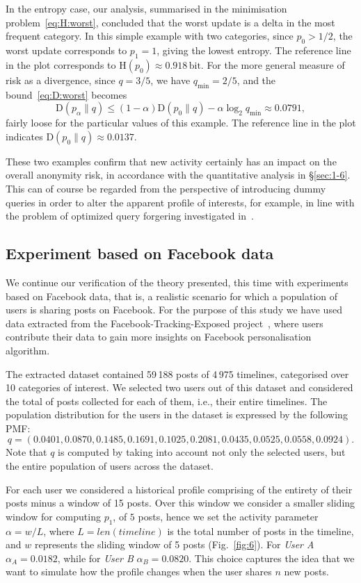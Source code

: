 In the entropy case, our analysis, summarised in the minimisation problem~\eqref{eq:H:worst}, concluded that the worst update is a delta in the most frequent category. In this simple example with two categories, since $p_0>1/2$, the worst update corresponds to $p_1=1$, giving the lowest entropy. The reference line in the plot corresponds to $\mathrm{H}(p_0)\approx 0.918\,\text{bit}$.
For the more general measure of risk as a divergence, since $q=3/5$, we have $q_\mathrm{min}=2/5$, and the bound~\eqref{eq:D:worst} becomes
$$\mathrm{D}(p_\alpha\|q) \leqslant (1-\alpha) \mathrm{D}(p_0\|q) - \alpha \log_2 q_\mathrm{min} \approx 0.0791,$$
fairly loose for the particular values of this example. The reference line in the plot indicates
$\mathrm{D}(p_0\|q)\approx 0.0137$.

These two examples confirm that new activity certainly has an impact on the overall anonymity risk, in accordance with the quantitative analysis in \S\ref{sec:1-6}. This can of course be regarded from the perspective of introducing dummy queries in order to alter the apparent profile of interests, for example, in line with the problem of optimized query forgering investigated in~\cite{Rebollo10IT}.

\subsection{Experiment based on Facebook data}

\noindent
We continue our verification of the theory presented, this time with experiments based on Facebook data, that is, a realistic scenario for which a population of users is sharing posts on Facebook. For the purpose of this study we have used data extracted from the Facebook-Tracking-Exposed project~\cite{FTE}, where users contribute their data to gain more insights on Facebook personalisation algorithm.

The extracted dataset contained 59\,188 posts of 4\,975 timelines, categorised over 10 categories of interest. We selected two users out of this dataset and considered the total of posts collected for each of them, i.e., their entire timelines. The population distribution for the users in the dataset is expressed by the following PMF: 
$$q=(0.0401,0.0870,0.1485,0.1691,0.1025,0.2081,0.0435,0.0525,0.0558,0.0924).$$
Note that $q$ is computed by taking into account not only the selected users, but the entire population of users across the dataset.

For each user we considered a historical profile comprising of the entirety of their posts minus a window of 15 posts. Over this window we consider a smaller sliding window for computing $p_1$, of $5$ posts, hence we set the activity parameter $\alpha = w/L$, where $L=len(timeline)$ is the total number of posts in the timeline, and $w$ represents the sliding window of 5 posts (Fig.~\ref{fig:6}). For \emph{User A} $\alpha_A = 0.0182$, while for \emph{User B} $\alpha_B= 0.0820$. This choice captures the idea that we want to simulate how the profile changes when the user shares $n$ new posts.

